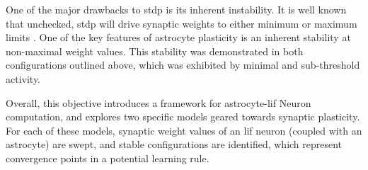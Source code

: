 One of the major drawbacks to \gls{stdp} is its inherent instability. It is well known
that unchecked, \gls{stdp} will drive synaptic weights to either minimum or maximum
limits \parencite{legenstein_2005}. One of the key features of astrocyte plasticity
is an inherent stability at non-maximal weight values. This stability was
demonstrated in both configurations outlined above, which was exhibited by
minimal and sub-threshold \ca activity.

Overall, this objective introduces a framework for astrocyte-\gls{lif} Neuron
computation, and explores two specific models geared towards synaptic
plasticity. For each of these models, synaptic weight values of an \gls{lif} neuron
(coupled with an astrocyte) are swept, and stable configurations are identified,
which represent convergence points in a potential learning rule.




